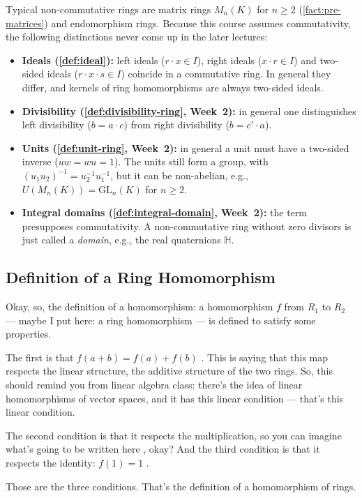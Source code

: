 \begin{aiNote}
Typical non-commutative rings are matrix rings $M_n(K)$ for $n \ge 2$ (\cref{fact:pre-matrices}) and endomorphism rings. Because this course assumes commutativity, the following distinctions never come up in the later lectures:
\begin{itemize}
    \item \textbf{Ideals (\cref{def:ideal}):} left ideals ($r \cdot x \in I$), right ideals ($x \cdot r \in I$) and two-sided ideals ($r \cdot x \cdot s \in I$) coincide in a commutative ring. In general they differ, and kernels of ring homomorphisms are always two-sided ideals.
    \item \textbf{Divisibility (\cref{def:divisibility-ring}, Week~2):} in general one distinguishes left divisibility ($b = a \cdot c$) from right divisibility ($b = c' \cdot a$).
    \item \textbf{Units (\cref{def:unit-ring}, Week~2):} in general a unit must have a two-sided inverse ($u w = w u = 1$). The units still form a group, with $(u_1 u_2)^{-1} = u_2^{-1} u_1^{-1}$, but it can be non-abelian, e.g., $U(M_n(K)) = \mathrm{GL}_n(K)$ for $n \ge 2$.
    \item \textbf{Integral domains (\cref{def:integral-domain}, Week~2):} the term presupposes commutativity. A non-commutative ring without zero divisors is just called a \emph{domain}, e.g., the real quaternions $\mathbb{H}$.
\end{itemize}
\end{aiNote}

\subsection{Definition of a Ring Homomorphism}

\begin{speech}[00:18:44 - 00:20:03]
Okay, so, the definition of a homomorphism: a homomorphism $f$ from $R_1$ to $R_2$  --- maybe I put here: a ring homomorphism  --- is defined to satisfy some properties.

The first is that $f(a + b) = f(a) + f(b)$ . This is saying that this map respects the linear structure, the additive structure of the two rings. So, this should remind you from linear algebra class: there's the idea of linear homomorphisms of vector spaces, and it has this linear condition --- that's this linear condition.

The second condition is that it respects the multiplication, so you can imagine what's going to be written here , okay? And the third condition is that it respects the identity: $f(1) = 1$ .

Those are the three conditions. That's the definition of a homomorphism of rings.
\end{speech}

